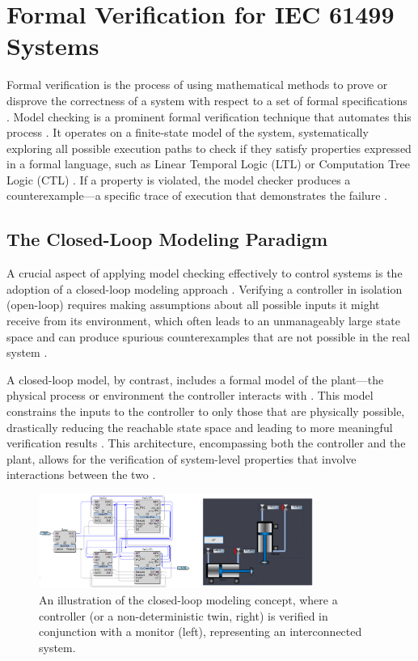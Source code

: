 \section{Formal Verification for IEC 61499 Systems}\label{sec:formal_verification}

Formal verification is the process of using mathematical methods to prove or disprove the correctness of a system with respect to a set of formal specifications . Model checking is a prominent formal verification technique that automates this process . It operates on a finite-state model of the system, systematically exploring all possible execution paths to check if they satisfy properties expressed in a formal language, such as Linear Temporal Logic (LTL) or Computation Tree Logic (CTL) . If a property is violated, the model checker produces a counterexample—a specific trace of execution that demonstrates the failure .

\subsection{The Closed-Loop Modeling Paradigm}

A crucial aspect of applying model checking effectively to control systems is the adoption of a closed-loop modeling approach . Verifying a controller in isolation (open-loop) requires making assumptions about all possible inputs it might receive from its environment, which often leads to an unmanageably large state space and can produce spurious counterexamples that are not possible in the real system .

A closed-loop model, by contrast, includes a formal model of the plant—the physical process or environment the controller interacts with . This model constrains the inputs to the controller to only those that are physically possible, drastically reducing the reachable state space and leading to more meaningful verification results . This architecture, encompassing both the controller and the plant, allows for the verification of system-level properties that involve interactions between the two .

\begin{figure}[h]
\centering
\includegraphics[width=0.8\textwidth]{chapters/images/chapter2/wholesystem_withhmi.png}
\caption{An illustration of the closed-loop modeling concept, where a controller (or a non-deterministic twin, right) is verified in conjunction with a monitor (left), representing an interconnected system.}
\label{fig:closed_loop}
\end{figure}

